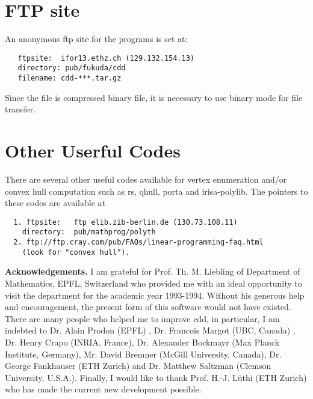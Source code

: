 \section{FTP site}  \label{FTP}
An anonymous ftp site for the programs is set at:
\begin{verbatim}
   ftpsite:  ifor13.ethz.ch (129.132.154.13)
   directory: pub/fukuda/cdd
   filename: cdd-***.tar.gz
\end{verbatim}
Since the file is compressed binary file, it is necessary to use binary mode for
file transfer.

\section{Other Userful Codes}  \label{CODES}
There are several other useful codes available for vertex enumeration and/or
convex hull computation  such as rs, qhull, porta and irisa-polylib.
The pointers to these codes are available at
\begin{verbatim}
  1. ftpsite:   ftp elib.zib-berlin.de (130.73.108.11)      
    directory:  pub/mathprog/polyth
  2. ftp://ftp.cray.com/pub/FAQs/linear-programming-faq.html
    (look for "convex hull").
\end{verbatim}


\bigskip
\noindent
{\large {\bf Acknowledgements.}} 
I am  grateful for Prof. Th. M. Liebling of
Department of Mathematics, EPFL, Switzerland who
provided me with an ideal opportunity to visit the department
for the academic year 1993-1994.  Without his 
generous help and encouragement,
the present form of this software would not have existed.
There are many people who helped me to improve cdd,  in particular,
I am indebted to Dr. Alain Prodon (EPFL) , Dr. Francois Margot
(UBC, Canada) , Dr. Henry Crapo (INRIA, France),
Dr. Alexander Bockmayr (Max Planck Institute, Germany), 
Mr. David Bremner (McGill University, Canada),
Dr. George Fankhauser (ETH Zurich) and
Dr.  Matthew Saltzman (Clemson University, U.S.A.). 
Finally, I would like to thank Prof. H.-J. L\"uthi
(ETH Zurich) who has made the current new development
possible. 


